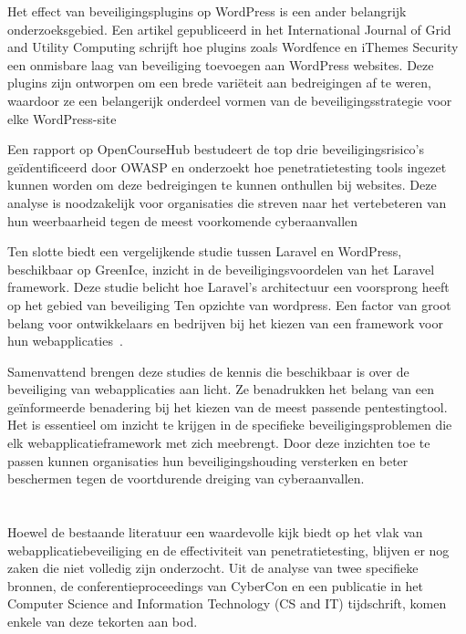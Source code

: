 Het effect van beveiligingsplugins op WordPress is een ander belangrijk onderzoeksgebied. Een artikel gepubliceerd in het International Journal of Grid and Utility Computing 
schrijft hoe plugins zoals Wordfence en iThemes Security een onmisbare laag van beveiliging toevoegen aan WordPress websites. Deze plugins zijn ontworpen om een brede variëteit 
aan bedreigingen af te weren, waardoor ze een belangerijk onderdeel vormen van de beveiligingsstrategie voor elke WordPress-site~\autocite{Casola2020}

Een rapport op OpenCourseHub bestudeert de top drie beveiligingsrisico's geïdentificeerd door OWASP en onderzoekt hoe penetratietesting tools ingezet kunnen 
worden om deze bedreigingen te kunnen onthullen bij websites. Deze analyse is noodzakelijk voor organisaties die streven naar het vertebeteren van hun weerbaarheid tegen 
de meest voorkomende cyberaanvallen ~\autocite{Sharma2023}

Ten slotte biedt een vergelijkende studie tussen Laravel en WordPress, beschikbaar op GreenIce, inzicht in de beveiligingsvoordelen van het Laravel framework. 
Deze studie belicht hoe Laravel's architectuur een voorsprong heeft op het gebied van beveiliging Ten opzichte van wordpress. Een factor van groot belang voor 
ontwikkelaars en bedrijven bij het kiezen van een framework voor hun webapplicaties~\autocite{Lebedeva2023}.

Samenvattend brengen deze studies de kennis die beschikbaar is over de beveiliging van webapplicaties aan licht. Ze benadrukken het belang van een geïnformeerde benadering bij 
het kiezen van de meest passende pentestingtool. Het is essentieel om inzicht te krijgen in de specifieke beveiligingsproblemen die elk webapplicatieframework met zich meebrengt. Door deze inzichten 
toe te passen kunnen organisaties hun beveiligingshouding versterken en beter beschermen tegen de voortdurende dreiging van cyberaanvallen.

\section{}
Hoewel de bestaande literatuur een waardevolle kijk biedt op het vlak van webapplicatiebeveiliging en de effectiviteit van penetratietesting, blijven er nog 
zaken die niet volledig zijn onderzocht. Uit de analyse van twee specifieke bronnen, de conferentieproceedings van CyberCon en een publicatie in het 
Computer Science and Information Technology (CS and IT) tijdschrift, komen enkele van deze tekorten aan bod.

